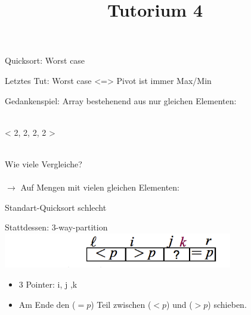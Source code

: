 
\title[Algorithmen I SS 14]{Tutorium 4}

\usepackage{alltt}





\begin{frame}
  \maketitle
\end{frame}

\begin{frame} {Quicksort: Worst case}

	Letztes Tut: Worst case <=> Pivot ist immer Max/Min
	
	\begin{exampleblock} {Gedankenspiel:}
		Array bestehenend aus nur gleichen Elementen: \ \\
		\ \\
		\centerline{< 2, 2, 2, 2 >}
		\ \\
		Wie viele Vergleiche?
		\ \\
		\ \\
		$\rightarrow$ Auf Mengen mit vielen gleichen Elementen: \\
		\centerline{Standart-Quicksort schlecht}
		
	\end{exampleblock} 
\end{frame}

\begin{frame}{Stattdessen: 3-way-partition}
	\includegraphics[width=10cm]{images/threeway} \\
	\begin{itemize}
		\item 3 Pointer: i, j ,k 
		\item Am Ende den ($ = p$) Teil zwischen ($< p$) und ($> p$) schieben.
	\end{itemize}

\end{frame}

